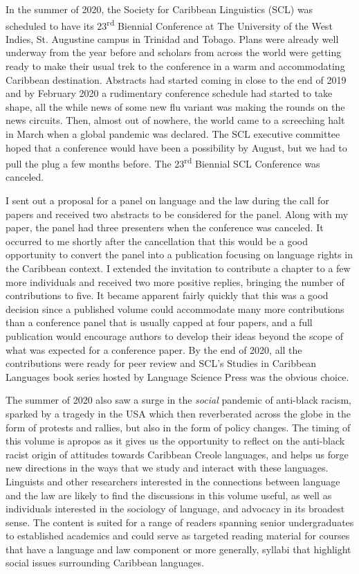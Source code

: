 
In the summer of 2020, the Society for Caribbean Linguistics (SCL) was scheduled to have its 23\textsuperscript{rd} Biennial Conference at The University of the West Indies, St. Augustine campus in Trinidad and Tobago. Plans were already well underway from the year before and scholars from across the world were getting ready to make their usual trek to the conference in a warm and accommodating Caribbean destination. Abstracts had started coming in close to the end of 2019 and by February 2020 a rudimentary conference schedule had started to take shape, all the while news of some new flu variant was making the rounds on the news circuits. Then, almost out of nowhere, the world came to a screeching halt in March when a global pandemic was declared. The SCL executive committee hoped that a conference would have been a possibility by August, but we had to pull the plug a few months before. The 23\textsuperscript{rd} Biennial SCL Conference was canceled. 

I sent out a proposal for a panel on language and the law during the call for papers and received two abstracts to be considered for the panel. Along with my paper, the panel had three presenters when the conference was canceled. It occurred to me shortly after the cancellation that this would be a good opportunity to convert the panel into a publication focusing on language rights in the Caribbean context. I extended the invitation to contribute a chapter to a few more individuals and received two more positive replies, bringing the number of contributions to five. It became apparent fairly quickly that this was a good decision since a published volume could accommodate many more contributions than a conference panel that is usually capped at four papers, and a full publication would encourage authors to develop their ideas beyond the scope of what was expected for a conference paper. By the end of 2020, all the contributions were ready for peer review and SCL’s Studies in Caribbean Languages book series hosted by Language Science Press was the obvious choice.

The summer of 2020 also saw a surge in the \emph{social} pandemic of anti-black racism, sparked by a tragedy in the USA which then reverberated across the globe in the form of protests and rallies, but also in the form of policy changes. The timing of this volume is apropos as it gives us the opportunity to reflect on the anti-black racist origin of attitudes towards Caribbean Creole languages, and helps us forge new directions in the ways that we study and interact with these languages. Linguists and other researchers interested in the connections between language and the law are likely to find the discussions in this volume useful, as well as individuals interested in the sociology of language, and advocacy in its broadest sense. The content is suited for a range of readers spanning senior undergraduates to established academics and could serve as targeted reading material for courses that have a language and law component or more generally, syllabi that highlight social issues surrounding Caribbean languages. 

